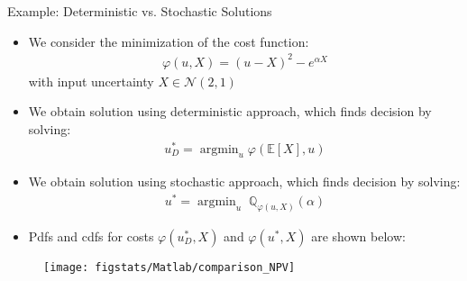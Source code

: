 \documentclass[9pt]{beamer}
\begin{document}
%
\begin{frame}{Example: Deterministic vs. Stochastic Solutions}

\begin{itemize}
\item We consider the minimization of the cost function:
\begin{align*}
\varphi(u,X)=(u-X)^2-e^{\alpha X}
\end{align*}
with  input uncertainty $X\in \mathcal{N}(2,1)$
\item We obtain solution using deterministic approach, which finds decision by solving:
\begin{align*}
u_D^*=\mathop{\textrm{argmin}}_{u}\varphi (\mathbb{E}[X],u)
\end{align*}
\item We obtain solution using stochastic approach, which finds decision by solving:
\begin{align*}
u^*=\mathop{\textrm{argmin}}_u\; \mathbb{Q}_{\varphi(u,X)}(\alpha)
\end{align*}
\item Pdfs and cdfs for costs $\varphi(u^*_D,X)$ and $\varphi(u^*,X)$ are shown below:
\end{itemize}
\begin{figure}[!htb]
    \centering
	\texttt{[image: figstats/Matlab/comparison\_NPV]}
\end{figure}

\end{frame}

% 
\end{document}
